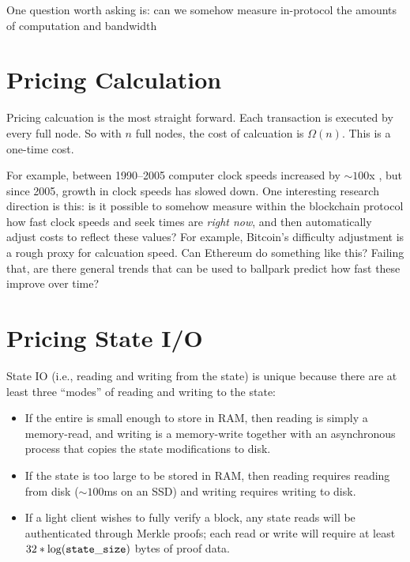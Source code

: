 \documentclass[12pt, final]{article}
\begin{document}
One question worth asking is: can we somehow measure in-protocol the amounts of computation and bandwidth




\section{Pricing Calculation}
\label{sect:calculation}

Pricing calcuation is the most straight forward.  Each transaction is executed by every full node.  So with $n$ full nodes, the cost of calcuation is $\Omega(n)$.  This is a one-time cost.

For example, between 1990--2005 computer clock speeds increased by $\sim \! 100$x \cite{40years}, but since 2005, growth in clock speeds has slowed down.  One interesting research direction is this: is it possible to somehow measure within the  blockchain protocol how fast clock speeds and seek times are \emph{right now}, and then automatically adjust costs to reflect these values?  For example, Bitcoin's difficulty adjustment is a rough proxy for calcuation speed.  Can Ethereum do something like this?  Failing that, are there general trends that can be used to ballpark predict how fast these improve over time?



\section{Pricing State I/O}
\label{sect:io}
State IO (i.e., reading and writing from the state) is unique because there are at least three ``modes'' of reading and writing to the state:

\begin{itemize}
\item If the entire is small enough to store in RAM, then reading is simply a memory-read, and writing is a memory-write together with an asynchronous process that copies the state modifications to disk.

\item If the state is too large to be stored in RAM, then reading requires reading from disk ($\sim\!100$ms on an SSD) and writing requires writing to disk. 

\item If a light client wishes to fully verify a block, any state reads will be authenticated through Merkle proofs; each read or write will require at least $32 * \log(\tt{state\_size})$ bytes of proof data. 

\end{itemize}
\end{document}
